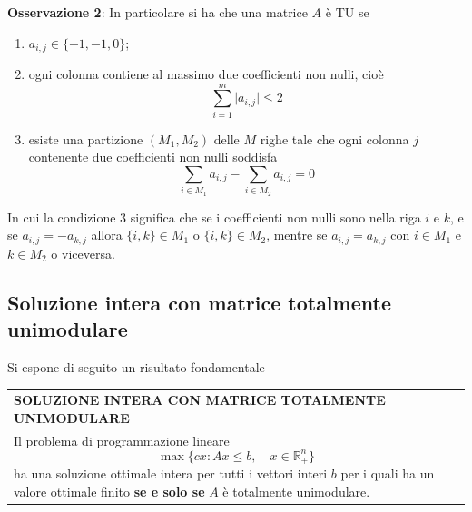 \documentclass[a4paper]{extarticle}
\renewcommand\arraystretch{}
\begin{document}
\vspace{2em}
\noindent
\textbf{Osservazione 2}: In particolare si ha che una matrice $A$ è TU se
\begin{enumerate}
    \item $a_{i,j} \in \{+1,-1,0\}$;
    \item ogni colonna contiene al massimo due coefficienti non nulli, cioè
    \[\sum_{i=1}^m \vert a_{i,j} \vert \leq 2\]
    \item esiste una partizione $(M_1,M_2)$ delle $M$ righe tale che ogni colonna $j$ contenente due coefficienti non nulli soddisfa
    \[\sum_{i \in M_1} a_{i,j} - \sum_{i \in M_2} a_{i,j}=0\]
\end{enumerate}
In cui la condizione $3$ significa che se i coefficienti non nulli sono nella riga $i$ e $k$, e se $a_{i,j} = -a_{k,j}$ allora $\{i,k\} \in M_1$ o $\{i,k\} \in M_2$, mentre se
$a_{i,j}=a_{k,j}$ con $i\in M_1$ e $k\in M_2$ o viceversa.

\vspace{1em}
\noindent
\subsection{Soluzione intera con matrice totalmente unimodulare}
Si espone di seguito un risultato fondamentale

\vspace{1em}
\setlength{\tabcolsep}{14pt}
\renewcommand{\arraystretch}{2}
\noindent
\begin{tabularx}{\textwidth}{@{}|P|@{}}
    \hline
    {\textbf{SOLUZIONE INTERA CON MATRICE TOTALMENTE UNIMODULARE}}\\
    \parbox{\linewidth}{Il problema di programmazione lineare
    \[\max\{cx : Ax \leq b, \hspace{1em} x \in \mathbb{R}^n_+\}\]
    ha una soluzione ottimale intera per tutti i vettori interi $b$ per i quali ha un valore ottimale finito \textbf{se e solo se} $A$ è totalmente unimodulare.\vspace{3mm}}\\
    \hline
\end{tabularx}

\vspace{1em}
\noindent
\end{document}
